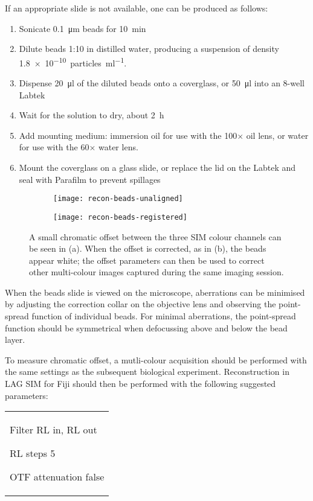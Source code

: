 If an appropriate slide is not available, one can be produced as follows: 
\begin{enumerate}
	\item Sonicate \SI{0.1}{\micro\metre} beads for \SI{10}{\minute}
	\item Dilute beads 1:10 in distilled water, producing a suspension of density \SI{1.8e-10}{particles\per\milli\litre}. 
	\item Dispense \SI{20}{\micro\litre} of the diluted beads onto a coverglass, or \SI{50}{\micro\litre} into an 8-well Labtek
	\item Wait for the solution to dry, about \SI{2}{\hour}
	\item Add mounting medium: immersion oil for use with the 100$\times$ oil lens, or water for use with the 60$\times$ water lens. 
	\item Mount the coverglass on a glass slide, or replace the lid on the Labtek and seal with Parafilm to prevent spillages
\end{enumerate}

\begin{figure}[p]
\centering
\begin{subfigure}[b]{0.49\textwidth}
	\texttt{[image: recon-beads-unaligned]}
	\caption{}\label{fig:recon-beads-unaligned}
\end{subfigure}
\hfill
\begin{subfigure}[b]{0.49\textwidth}
	\texttt{[image: recon-beads-registered]}
	\caption{}\label{fig:recon-beads-registered}
\end{subfigure}
\caption[LAG SIM: Multicolour alignment beads are used for correcting chromatic offset]{A small chromatic offset between the three SIM colour channels can be seen in (a). When the offset is corrected, as in (b), the beads appear white; the offset parameters can then be used to correct other multi-colour images captured during the same imaging session.  } 
\label{fig:recon-beads}
\end{figure}

When the beads slide is viewed on the microscope, aberrations can be minimised by adjusting the correction collar on the objective lens and observing the point-spread function of individual beads. 
For minimal aberrations, the point-spread function should be symmetrical when defocussing above and below the bead layer. 

To measure chromatic offset, a mutli-colour acquisition should be performed with the same settings as the subsequent biological experiment. 
Reconstruction in LAG SIM for Fiji should then be performed with the following suggested parameters: \newline
\begin{tabular}{p{}}
\begin{labelling}[margin=OTF attenuation]
	\item[Filter] RL in, RL out
	\item[RL steps] 5
	\item[OTF attenuation] false
\end{labelling}
\end{tabular}

